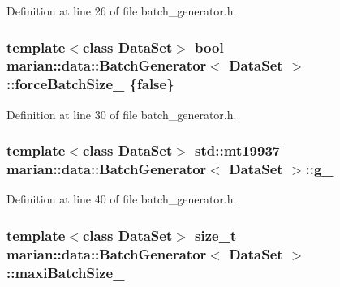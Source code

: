 Definition at line 26 of file batch\+\_\+generator.\+h.

\subsubsection[{\texorpdfstring{force\+Batch\+Size\+\_\+}{forceBatchSize_}}]{\setlength{\rightskip}{0pt plus 5cm}template$<$class Data\+Set$>$ bool {\bf marian\+::data\+::\+Batch\+Generator}$<$ Data\+Set $>$\+::force\+Batch\+Size\+\_\+ \{false\}\hspace{0.3cm}{\ttfamily [private]}}\hypertarget{classmarian_1_1data_1_1BatchGenerator_afde953e133498a8edcc993611299b135}{}\label{classmarian_1_1data_1_1BatchGenerator_afde953e133498a8edcc993611299b135}


Definition at line 30 of file batch\+\_\+generator.\+h.

\subsubsection[{\texorpdfstring{g\+\_\+}{g_}}]{\setlength{\rightskip}{0pt plus 5cm}template$<$class Data\+Set$>$ std\+::mt19937 {\bf marian\+::data\+::\+Batch\+Generator}$<$ Data\+Set $>$\+::g\+\_\+\hspace{0.3cm}{\ttfamily [private]}}\hypertarget{classmarian_1_1data_1_1BatchGenerator_a08b191a4be23424df9c45712f0410a32}{}\label{classmarian_1_1data_1_1BatchGenerator_a08b191a4be23424df9c45712f0410a32}


Definition at line 40 of file batch\+\_\+generator.\+h.

\subsubsection[{\texorpdfstring{maxi\+Batch\+Size\+\_\+}{maxiBatchSize_}}]{\setlength{\rightskip}{0pt plus 5cm}template$<$class Data\+Set$>$ size\+\_\+t {\bf marian\+::data\+::\+Batch\+Generator}$<$ Data\+Set $>$\+::maxi\+Batch\+Size\+\_\+\hspace{0.3cm}{\ttfamily [private]}}\hypertarget{classmarian_1_1data_1_1BatchGenerator_a17267c3eaeaae25b4ac0c02a4308f9f8}{}\label{classmarian_1_1data_1_1BatchGenerator_a17267c3eaeaae25b4ac0c02a4308f9f8}


